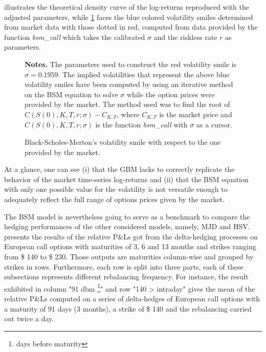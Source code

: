 \documentclass[12pt,a4paper]{report}
\begin{document}
 illustrates the theoretical density curve of the log-returns reproduced with the adjusted parameters, while \cref{p:analysis:gbm:option:adjusted} faces the blue colored volatility smiles determined from market data with those dotted in red, computed from data provided by the function \textit{bsm\_call} which takes the calibrated $\sigma$ and the riskless rate $r$ as parameters.

\begin{figure}[h]
  \centering
  
  \caption{Black-Scholes-Merton's volatility smile with respect to the one provided by the market.}
  \begin{changemargin}{0.5cm}{0.5cm}
  \medskip
\footnotesize
{}\textbf{Notes.} The parameters used to construct the red volatility smile is $\sigma =  0.1959$.
The implied volatilities that represent the above blue volatility smiles have been computed by using an iterative method on the BSM equation to solve  $\sigma$ while the option prices were provided by the market.
The method used was to find the root of $C(S(0), K, T, r; \sigma) - C_{K, T}$, where $C_{K, T}$ is the market price and $C(S(0), K, T, r; \sigma)$ is the function \textit{bsm\_call} with $\sigma$ as a cursor.
  \end{changemargin}
  \label{p:analysis:gbm:option:adjusted}
\end{figure}

At a glance, one can see (i) that the GBM lacks to correctly replicate the behavior of the market time-series log-returns and (ii) that the BSM equation with only one possible value for the volatility is not versatile enough to adequately reflect the full range of options prices given by the market.























The BSM model is nevertheless going to serve as a benchmark to compare the hedging performances of the other considered models, namely, MJD and HSV.
 presents the results of the relative P\&Ls got from the delta-hedging processes on European call options with maturities of 3, 6 and 13 months and strikes ranging from  \$ 140 to \$ 230.
Those outputs are maturities column-wise and grouped by strikes in rows.
Furthermore, each row is split into three parts, each of these subsections represents different rebalancing frequency.
For instance, the result exhibited in column "91 dbm \footnote{days before maturity}" and row "140 > intraday" gives the mean of the relative P\&Ls computed on a series of delta-hedges of European call options with a maturity of 91 days (3 months), a strike of  \$ 140 and the rebalancing carried out twice a day.
\end{document}
